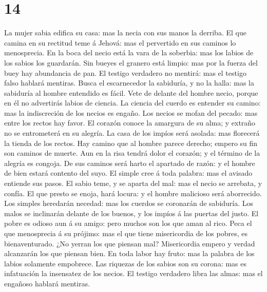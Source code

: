 \hypertarget{section-13}{%
\section{14}\label{section-13}}

 La mujer sabia edifica su casa: mas la necia con sus manos
la derriba.  El que camina en su rectitud teme á Jehová: mas
el pervertido en sus caminos lo menosprecia.  En la boca del
necio está la vara de la soberbia: mas los labios de los sabios los
guardarán.  Sin bueyes el granero está limpio: mas por la
fuerza del buey hay abundancia de pan.  El testigo verdadero
no mentirá: mas el testigo falso hablará mentiras.  Busca el
escarnecedor la sabiduría, y no la halla: mas la sabiduría al hombre
entendido es fácil.  Vete de delante del hombre necio,
porque en él no advertirás labios de ciencia.  La ciencia
del cuerdo es entender su camino: mas la indiscreción de los necios es
engaño.  Los necios se mofan del pecado: mas entre los
rectos hay favor.  El corazón conoce la amargura de su
alma; y extraño no se entrometerá en su alegría.  La casa
de los impíos será asolada: mas florecerá la tienda de los rectos.
 Hay camino que al hombre parece derecho; empero su fin son
caminos de muerte.  Aun en la risa tendrá dolor el corazón;
y el término de la alegría es congoja.  De sus caminos será
harto el apartado de razón: y el hombre de bien estará contento del
suyo.  El simple cree á toda palabra: mas el avisado
entiende sus pasos.  El sabio teme, y se aparta del mal:
mas el necio se arrebata, y confía.  El que presto se
enoja, hará locura: y el hombre malicioso será aborrecido. 
Los simples heredarán necedad: mas los cuerdos se coronarán de
sabiduría.  Los malos se inclinarán delante de los buenos,
y los impíos á las puertas del justo.  El pobre es odioso
aun á su amigo: pero muchos son los que aman al rico.  Peca
el que menosprecia á su prójimo: mas el que tiene misericordia de los
pobres, es bienaventurado.  ¿No yerran los que piensan mal?
Misericordia empero y verdad alcanzarán los que piensan bien.
 En toda labor hay fruto: mas la palabra de los labios
solamente empobrece.  Las riquezas de los sabios son su
corona: mas es infatuación la insensatez de los necios.  El
testigo verdadero libra las almas: mas el engañoso hablará mentiras.
